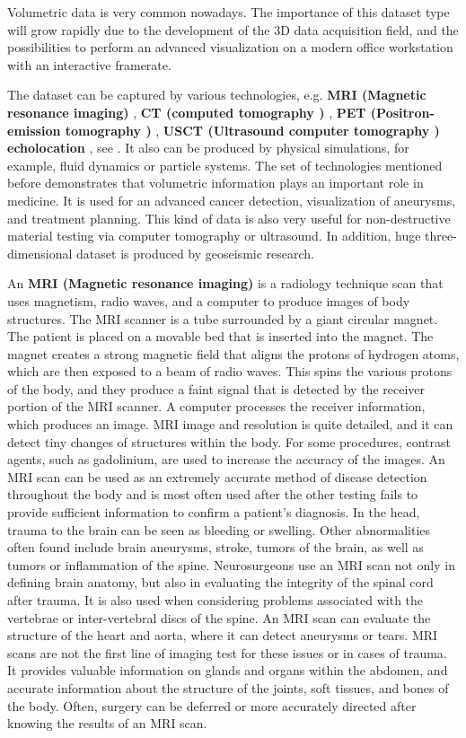 Volumetric data is very common nowadays. The importance of this dataset type will grow rapidly due to the development of the 3D data acquisition field, and the possibilities to perform an advanced visualization on a modern office workstation with an interactive framerate.


The dataset can be captured by various technologies, e.g. \textbf{  MRI (Magnetic resonance imaging) } , \textbf{ CT (computed tomography ) }, \textbf{PET (Positron-emission tomography ) }, \textbf{ USCT (Ultrasound computer tomography ) echolocation }, see \cite{radiology} . It also can be produced by physical simulations, for example, fluid dynamics or particle systems. The set of technologies mentioned before demonstrates that volumetric information plays an important role in medicine. It is used for an advanced cancer detection, visualization of aneurysms, and treatment planning. This kind of data is also very useful for non-destructive material testing via computer tomography or ultrasound. In addition, huge three-dimensional dataset is produced by geoseismic research.


An \textbf{  MRI (Magnetic resonance imaging) } is a radiology technique scan that uses magnetism, radio waves, and a computer to produce images of body structures. The MRI scanner is a tube surrounded by a giant circular magnet. The patient is placed on a movable bed that is inserted into the magnet. The magnet creates a strong magnetic field that aligns the protons of hydrogen atoms, which are then exposed to a beam of radio waves. This spins the various protons of the body, and they produce a faint signal that is detected by the receiver portion of the MRI scanner. A computer processes the receiver information, which produces an image.
MRI image and resolution is quite detailed, and it can detect tiny changes of structures within the body. For some procedures, contrast agents, such as gadolinium, are used to increase the accuracy of the images. \newline  An MRI scan can be used as an extremely accurate method of disease detection throughout the body and is most often used after the other testing fails to provide sufficient information to confirm a patient's diagnosis. In the head, trauma to the brain can be seen as bleeding or swelling. Other abnormalities often found include brain aneurysms, stroke, tumors of the brain, as well as tumors or inflammation of the spine.  \newline Neurosurgeons use an MRI scan not only in defining brain anatomy, but also in evaluating the integrity of the spinal cord after trauma. It is also used when considering problems associated with the vertebrae or inter-vertebral discs of the spine. An MRI scan can evaluate the structure of the heart and aorta, where it can detect aneurysms or tears. MRI scans are not the first line of imaging test for these issues or in cases of trauma.  \newline It provides valuable information on glands and organs within the abdomen, and accurate information about the structure of the joints, soft tissues, and bones of the body. Often, surgery can be deferred or more accurately directed after knowing the results of an MRI scan.



